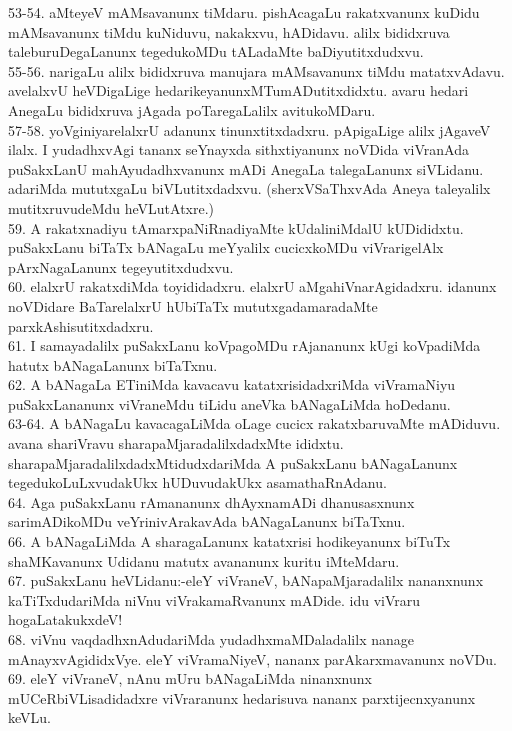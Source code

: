 \documentclass{article}
\begin{document}
53-54. aMteyeV mAMsavanunx tiMdaru. pishAcagaLu rakatxvanunx kuDidu mAMsavanunx tiMdu kuNiduvu, nakakxvu, hADidavu. alilx bididxruva taleburuDegaLanunx tegedukoMDu tALadaMte baDiyutitxdudxvu.\\
55-56. narigaLu alilx bididxruva manujara mAMsavanunx tiMdu matatxvAdavu. avelalxvU heVDigaLige hedarikeyanunxMTumADutitxdidxtu. avaru hedari AnegaLu bididxruva jAgada poTaregaLalilx avitukoMDaru.\\
57-58. yoVginiyarelalxrU adanunx tinunxtitxdadxru. pApigaLige alilx jAgaveV ilalx. I yudadhxvAgi tananx seYnayxda sithxtiyanunx noVDida viVranAda puSakxLanU mahAyudadhxvanunx mADi AnegaLa talegaLanunx siVLidanu. adariMda mututxgaLu biVLutitxdadxvu. (sherxVSaThxvAda Aneya taleyalilx mutitxruvudeMdu heVLutAtxre.)\\
59. A rakatxnadiyu tAmarxpaNiRnadiyaMte kUdaliniMdalU kUDididxtu. puSakxLanu biTaTx bANagaLu meYyalilx cucicxkoMDu viVrarigelAlx pArxNagaLanunx tegeyutitxdudxvu.\\
60. elalxrU rakatxdiMda toyididadxru. elalxrU aMgahiVnarAgidadxru. idanunx noVDidare BaTarelalxrU hUbiTaTx mututxgadamaradaMte parxkAshisutitxdadxru.\\
61. I samayadalilx puSakxLanu koVpagoMDu rAjananunx kUgi koVpadiMda hatutx bANagaLanunx biTaTxnu.\\
62. A bANagaLa ETiniMda kavacavu katatxrisidadxriMda viVramaNiyu puSakxLananunx viVraneMdu tiLidu aneVka bANagaLiMda hoDedanu.\\
63-64. A bANagaLu kavacagaLiMda oLage cucicx rakatxbaruvaMte mADiduvu. avana shariVravu sharapaMjaradalilxdadxMte ididxtu. sharapaMjaradalilxdadxMtidudxdariMda A puSakxLanu bANagaLanunx tegedukoLuLxvudakUkx hUDuvudakUkx asamathaRnAdanu.\\
64. Aga puSakxLanu rAmananunx dhAyxnamADi dhanusasxnunx sarimADikoMDu veYrinivArakavAda bANagaLanunx biTaTxnu.\\
66. A bANagaLiMda A sharagaLanunx katatxrisi hodikeyanunx biTuTx shaMKavanunx Udidanu matutx avananunx kuritu iMteMdaru.\\
67. puSakxLanu heVLidanu:-eleY viVraneV, bANapaMjaradalilx nananxnunx kaTiTxdudariMda niVnu viVrakamaRvanunx mADide. idu viVraru hogaLatakukxdeV!\\
68. viVnu vaqdadhxnAdudariMda yudadhxmaMDaladalilx nanage mAnayxvAgididxVye. eleY viVramaNiyeV, nananx parAkarxmavanunx noVDu.\\
69. eleY viVraneV, nAnu mUru bANagaLiMda ninanxnunx mUCeRbiVLisadidadxre viVraranunx hedarisuva nananx parxtijecnxyanunx keVLu.\\
\end{document}
